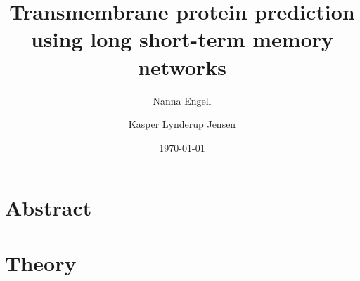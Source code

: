 \documentclass{article}
\title{Transmembrane protein prediction using long short-term memory networks}
\author{Nanna Engell \and
		Kasper Lynderup Jensen}
\date{\today}
\begin{document}
\maketitle

\section*{Abstract}

\tableofcontents




\section{Theory} 






\printbibliography
\end{document}
